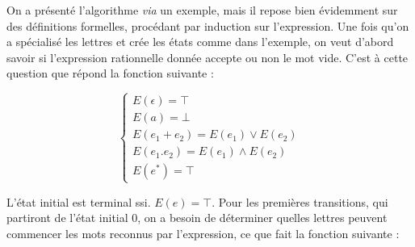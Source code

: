 \begin{example}
\begin{figure}[H]
\centering
{}
\end{figure}
\end{example}

On a présenté l'algorithme \textit{via} un exemple, mais il repose bien évidemment sur des définitions formelles, procédant par induction sur l'expression. Une fois qu'on a spécialisé les lettres et crée les états comme dans l'exemple, on veut d'abord savoir si l'expression rationnelle donnée accepte ou non le mot vide. C'est à cette question que répond la fonction suivante :

\[
\begin{cases}
E(\epsilon) = \top \\
E(a) = \bot \\
E(e_1+e_2) = E(e_1) \vee E(e_2) \\
E(e_1.e_2) = E(e_1) \wedge E(e_2) \\
E(e^*) = \top
\end{cases}
\]

L'état initial est terminal ssi. $E(e) = \top$. Pour les premières transitions, qui partiront de l'état initial $0$, on a besoin de déterminer quelles lettres peuvent commencer les mots reconnus par l'expression, ce que fait la fonction suivante : 

